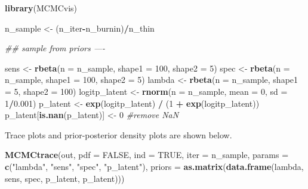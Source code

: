 \documentclass[]{article}
\newenvironment{Shaded}{\begin{snugshade}}{\end{snugshade}}
\newcommand{\CommentTok}[1]{\textcolor[rgb]{0.56,0.35,0.01}{\textit{#1}}}
\newcommand{\DataTypeTok}[1]{\textcolor[rgb]{0.13,0.29,0.53}{#1}}
\newcommand{\DecValTok}[1]{\textcolor[rgb]{0.00,0.00,0.81}{#1}}
\newcommand{\FloatTok}[1]{\textcolor[rgb]{0.00,0.00,0.81}{#1}}
\newcommand{\KeywordTok}[1]{\textcolor[rgb]{0.13,0.29,0.53}{\textbf{#1}}}
\newcommand{\NormalTok}[1]{#1}
\newcommand{\OperatorTok}[1]{\textcolor[rgb]{0.81,0.36,0.00}{\textbf{#1}}}
\newcommand{\OtherTok}[1]{\textcolor[rgb]{0.56,0.35,0.01}{#1}}
\newcommand{\StringTok}[1]{\textcolor[rgb]{0.31,0.60,0.02}{#1}}
\begin{document}
\begin{Shaded}
\begin{Highlighting}[]
\KeywordTok{library}\NormalTok{(MCMCvis)}

\NormalTok{n_sample <-}\StringTok{ }\NormalTok{(n_iter}\OperatorTok{-}\NormalTok{n_burnin)}\OperatorTok{/}\NormalTok{n_thin}

\CommentTok{## sample from priors ----}

\NormalTok{sens <-}\StringTok{ }\KeywordTok{rbeta}\NormalTok{(}\DataTypeTok{n =}\NormalTok{ n_sample, }\DataTypeTok{shape1 =} \DecValTok{100}\NormalTok{, }\DataTypeTok{shape2 =} \DecValTok{5}\NormalTok{)}
\NormalTok{spec <-}\StringTok{ }\KeywordTok{rbeta}\NormalTok{(}\DataTypeTok{n =}\NormalTok{ n_sample, }\DataTypeTok{shape1 =} \DecValTok{100}\NormalTok{, }\DataTypeTok{shape2 =} \DecValTok{5}\NormalTok{)}
\NormalTok{lambda <-}\StringTok{ }\KeywordTok{rbeta}\NormalTok{(}\DataTypeTok{n =}\NormalTok{ n_sample, }\DataTypeTok{shape1 =} \DecValTok{5}\NormalTok{, }\DataTypeTok{shape2 =} \DecValTok{100}\NormalTok{)}
\NormalTok{logitp_latent <-}\StringTok{ }\KeywordTok{rnorm}\NormalTok{(}\DataTypeTok{n =}\NormalTok{ n_sample, }\DataTypeTok{mean =} \DecValTok{0}\NormalTok{, }\DataTypeTok{sd =} \DecValTok{1}\OperatorTok{/}\FloatTok{0.001}\NormalTok{)}
\NormalTok{p_latent <-}\StringTok{ }\KeywordTok{exp}\NormalTok{(logitp_latent) }\OperatorTok{/}\StringTok{ }\NormalTok{(}\DecValTok{1} \OperatorTok{+}\StringTok{ }\KeywordTok{exp}\NormalTok{(logitp_latent))}
\NormalTok{p_latent[}\KeywordTok{is.nan}\NormalTok{(p_latent)] <-}\StringTok{ }\DecValTok{0} \CommentTok{#remove NaN}
\end{Highlighting}
\end{Shaded}

Trace plots and prior-posterior density plots are shown below.

\begin{Shaded}
\begin{Highlighting}[]
\KeywordTok{MCMCtrace}\NormalTok{(out,}
          \DataTypeTok{pdf =} \OtherTok{FALSE}\NormalTok{,}
          \DataTypeTok{ind =} \OtherTok{TRUE}\NormalTok{,}
          \DataTypeTok{iter =}\NormalTok{ n_sample,}
          \DataTypeTok{params =} \KeywordTok{c}\NormalTok{(}\StringTok{"lambda"}\NormalTok{, }\StringTok{"sens"}\NormalTok{, }\StringTok{"spec"}\NormalTok{, }\StringTok{"p_latent"}\NormalTok{),}
          \DataTypeTok{priors =} \KeywordTok{as.matrix}\NormalTok{(}\KeywordTok{data.frame}\NormalTok{(lambda, sens, spec, p_latent, p_latent)))}
\end{Highlighting}
\end{Shaded}
\end{document}
